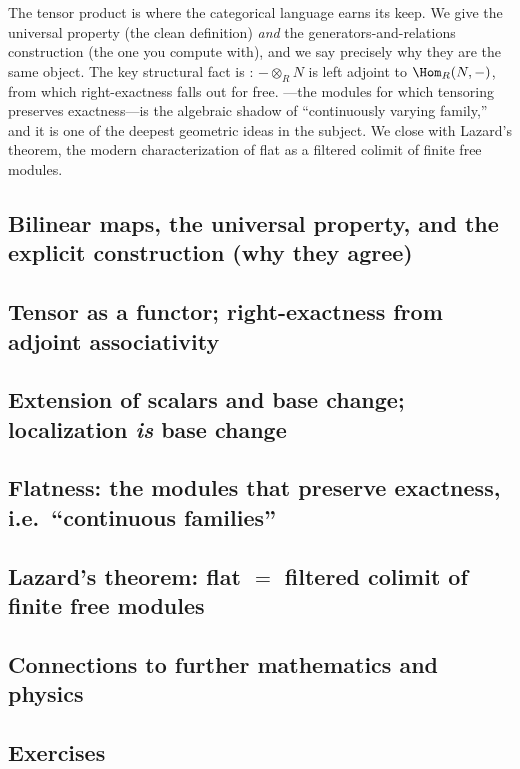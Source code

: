 \documentclass[11pt]{article}
\begin{document}
\noindent
The tensor product is where the categorical language earns its keep. We give the universal
property (the clean definition) \emph{and} the generators-and-relations construction (the
one you compute with), and we say precisely why they are the same object. The key structural
fact is : $-\otimes_R N$ is left adjoint to $\Hom_R(N,-)$, from
which right-exactness falls out for free. ---the modules for which tensoring
preserves exactness---is the algebraic shadow of ``continuously varying family,'' and it is
one of the deepest geometric ideas in the subject. We close with Lazard's theorem, the
modern characterization of flat as a filtered colimit of finite free modules.

\subsection{Bilinear maps, the universal property, and the explicit construction (why they agree)}

\subsection{Tensor as a functor; right-exactness from adjoint associativity}

\subsection{Extension of scalars and base change; localization \emph{is} base change}

\subsection{Flatness: the modules that preserve exactness, i.e.\ ``continuous families''}

\subsection{Lazard's theorem: flat \texorpdfstring{$=$}{=} filtered colimit of finite free modules}

\subsection{Connections to further mathematics and physics}

\subsection{Exercises}
\end{document}
